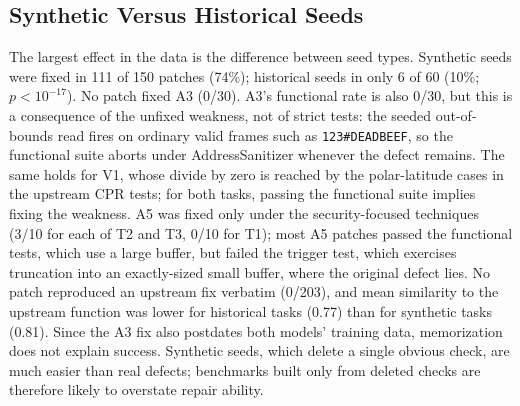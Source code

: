 \documentclass[12pt]{IEEEtran}
\begin{document}
\subsection{Synthetic Versus Historical Seeds}
The largest effect in the data is the difference between seed types. Synthetic seeds were fixed in 111 of 150 patches (74\%); historical seeds in only 6 of 60 (10\%; $p < 10^{-17}$). No patch fixed A3 (0/30). A3's functional rate is also 0/30, but this is a consequence of the unfixed weakness, not of strict tests: the seeded out-of-bounds read fires on ordinary valid frames such as \texttt{123\#DEADBEEF}, so the functional suite aborts under AddressSanitizer whenever the defect remains. The same holds for V1, whose divide by zero is reached by the polar-latitude cases in the upstream CPR tests; for both tasks, passing the functional suite implies fixing the weakness. A5 was fixed only under the security-focused techniques (3/10 for each of T2 and T3, 0/10 for T1); most A5 patches passed the functional tests, which use a large buffer, but failed the trigger test, which exercises truncation into an exactly-sized small buffer, where the original defect lies. No patch reproduced an upstream fix verbatim (0/203), and mean similarity to the upstream function was lower for historical tasks (0.77) than for synthetic tasks (0.81). Since the A3 fix also postdates both models' training data, memorization does not explain success. Synthetic seeds, which delete a single obvious check, are much easier than real defects; benchmarks built only from deleted checks are therefore likely to overstate repair ability.
\end{document}
